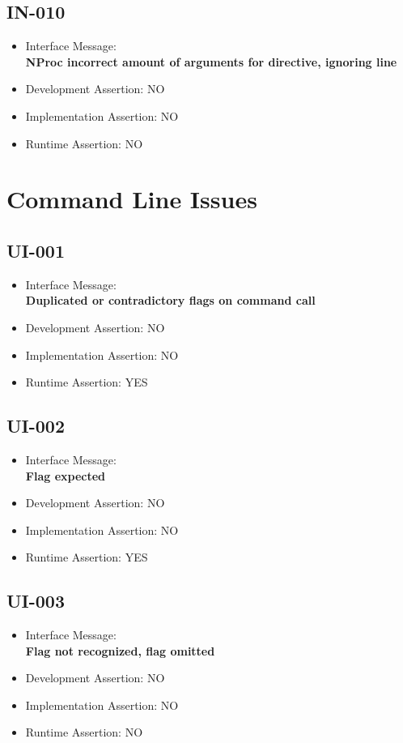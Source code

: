 \subsection{IN-010}
\begin{itemize}
  \item Interface Message:\\[1em]\textbf{NProc incorrect amount of arguments for directive, ignoring line}
  \item Development Assertion: NO
  \item Implementation Assertion: NO
  \item Runtime Assertion: NO
\end{itemize}

\section{Command Line Issues}

\subsection{UI-001}
\begin{itemize}
  \item Interface Message:\\[1em]\textbf{Duplicated or contradictory flags on command call}
  \item Development Assertion: NO
  \item Implementation Assertion: NO
  \item Runtime Assertion: YES
\end{itemize}

\subsection{UI-002}
\begin{itemize}
  \item Interface Message:\\[1em]\textbf{Flag expected}
  \item Development Assertion: NO
  \item Implementation Assertion: NO
  \item Runtime Assertion: YES
\end{itemize}

\subsection{UI-003}
\begin{itemize}
  \item Interface Message:\\[1em]\textbf{Flag not recognized, flag omitted}
  \item Development Assertion: NO
  \item Implementation Assertion: NO
  \item Runtime Assertion: NO
\end{itemize}

